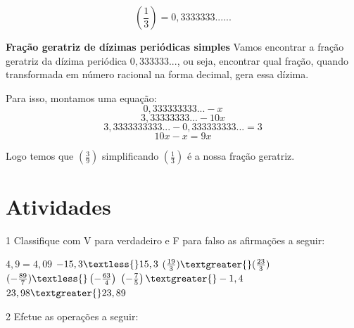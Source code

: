 {$$(\frac{1}{3}) = 0,3333333......$$

\smallskip\noindent\textbf{Fração geratriz de dízimas periódicas simples}\quad
Vamos encontrar a fração geratriz da dízima periódica $0,333333...$, ou
seja, encontrar qual fração, quando transformada em número racional na
forma decimal, gera essa dízima.

Para isso, montamos uma equação:
$$0,333333333... - x$$
$$3,33333333... - 10x$$
$$3,3333333333... - 0,333333333... = 3$$
$$10x - x = 9x$$

Logo temos que $(\frac{3}{9})$ simplificando $(\frac{1}{3})$ é a nossa
fração geratriz.
}



\section{Atividades}

\num{1} Classifique com V para verdadeiro e F para falso as afirmações a
seguir:

\begin{boxlist}
 $4,9 = 4,09$
 $-15,3 \textless{} 15,3$
 $(\frac{19}{3}) \textgreater{} (\frac{23}{3})$
 $(-\frac{89}{7}) \textless{} \left(- \frac{63}{4}\right )$
 $\left(- \frac{7}{5}\right ) \textgreater{} -1,4$
 $23,98 \textgreater{} 23,89$
\end{boxlist}



\num{2} Efetue as operações a seguir:


